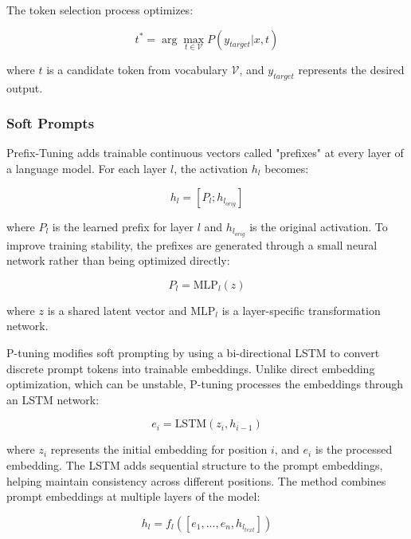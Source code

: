 The token selection process optimizes:

\begin{equation}
    t^* = \arg\max_{t \in \mathcal{V}} P(y_{target}|x, t)
\end{equation}

where $t$ is a candidate token from vocabulary $\mathcal{V}$, and $y_{target}$ represents the desired output.

\subsubsection{Soft Prompts}

Prefix-Tuning adds trainable continuous vectors called "prefixes" at every layer of a language model. For each layer $l$, the activation $h_l$ becomes:

\begin{equation}
    h_l = [P_l; h_{l_{orig}}]
\end{equation}

where $P_l$ is the learned prefix for layer $l$ and $h_{l_{orig}}$ is the original activation. To improve training stability, the prefixes are generated through a small neural network rather than being optimized directly:

\begin{equation}
    P_l = \text{MLP}_l(z)
\end{equation}

where $z$ is a shared latent vector and $\text{MLP}_l$ is a layer-specific transformation network.

P-tuning modifies soft prompting by using a bi-directional LSTM to convert discrete prompt tokens into trainable embeddings. Unlike direct embedding optimization, which can be unstable, P-tuning processes the embeddings through an LSTM network:

\begin{equation}
    e_i = \text{LSTM}(z_i, h_{i-1})
\end{equation}

where $z_i$ represents the initial embedding for position $i$, and $e_i$ is the processed embedding. The LSTM adds sequential structure to the prompt embeddings, helping maintain consistency across different positions. The method combines prompt embeddings at multiple layers of the model:

\begin{equation}
    h_l = f_l([e_1, ..., e_n, h_{l_{text}}])
\end{equation}

